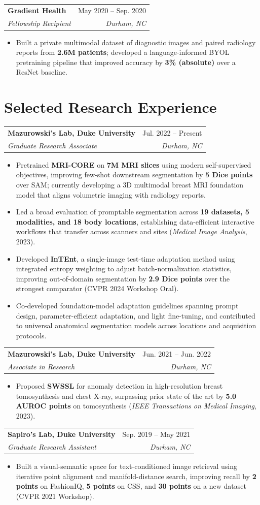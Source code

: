 \documentclass[letterpaper,10pt]{article}
\makeatletter
\newcommand{\entry}[4]{%
  \begin{tabular*}{\textwidth}{l@{\extracolsep{\fill}}r}
    \textbf{#1} & #2 \\
    \textit{#3} & \textit{#4}
  \end{tabular*}\vspace{-4pt}
}
\newcommand{\bullets}{\begin{itemize}[leftmargin=0.18in,topsep=3pt,itemsep=4pt,parsep=0pt,partopsep=0pt]}
\newcommand{\finishbullets}{\end{itemize}\vspace{2pt}}
\makeatother
\begin{document}
\entry{Gradient Health}{May 2020 -- Sep. 2020}{Fellowship Recipient}{Durham, NC}
\bullets
  \item Built a private multimodal dataset of diagnostic images and paired radiology reports from \textbf{2.6M patients}; developed a language-informed BYOL pretraining pipeline that improved accuracy by \textbf{3\% (absolute)} over a ResNet baseline.
\finishbullets

\section{Selected Research Experience}
\entry{Mazurowski's Lab, Duke University}{Jul. 2022 -- Present}{Graduate Research Associate}{Durham, NC}
\bullets
  \item Pretrained \textbf{MRI-CORE} on \textbf{7M MRI slices} using modern self-supervised objectives, improving few-shot downstream segmentation by \textbf{5 Dice points} over SAM; currently developing a 3D multimodal breast MRI foundation model that aligns volumetric imaging with radiology reports.
  \item Led a broad evaluation of promptable segmentation across \textbf{19 datasets, 5 modalities, and 18 body locations}, establishing data-efficient interactive workflows that transfer across scanners and sites (\textit{Medical Image Analysis}, 2023).
  \item Developed \textbf{InTEnt}, a single-image test-time adaptation method using integrated entropy weighting to adjust batch-normalization statistics, improving out-of-domain segmentation by \textbf{2.9 Dice points} over the strongest comparator (CVPR 2024 Workshop Oral).
  \item Co-developed foundation-model adaptation guidelines spanning prompt design, parameter-efficient adaptation, and light fine-tuning, and contributed to universal anatomical segmentation models across locations and acquisition protocols.
\finishbullets

\entry{Mazurowski's Lab, Duke University}{Jun. 2021 -- Jun. 2022}{Associate in Research}{Durham, NC}
\bullets
  \item Proposed \textbf{SWSSL} for anomaly detection in high-resolution breast tomosynthesis and chest X-ray, surpassing prior state of the art by \textbf{5.0 AUROC points} on tomosynthesis (\textit{IEEE Transactions on Medical Imaging}, 2023).
\finishbullets

\entry{Sapiro's Lab, Duke University}{Sep. 2019 -- May 2021}{Graduate Research Assistant}{Durham, NC}
\bullets
  \item Built a visual-semantic space for text-conditioned image retrieval using iterative point alignment and manifold-distance search, improving recall by \textbf{2 points} on FashionIQ, \textbf{5 points} on CSS, and \textbf{30 points} on a new dataset (CVPR 2021 Workshop).
\finishbullets
\end{document}
